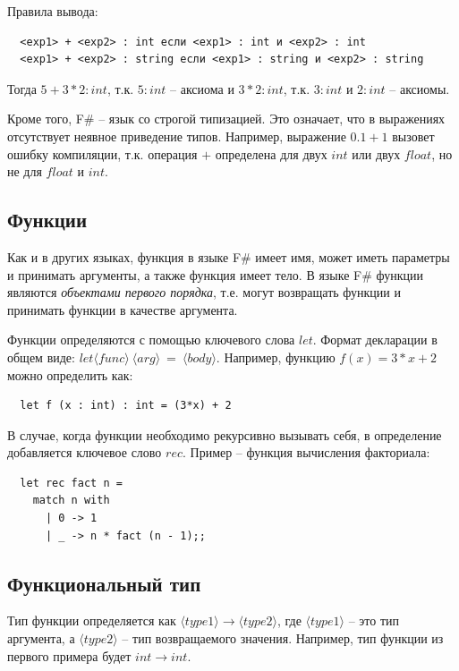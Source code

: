 \documentclass[a4paper,11pt]{article}
\begin{document}
Правила вывода:
\begin{lstlisting}
  <exp1> + <exp2> : int если <exp1> : int и <exp2> : int
  <exp1> + <exp2> : string если <exp1> : string и <exp2> : string
\end{lstlisting}

Тогда $5 + 3 * 2 : int$, т.к. $5 : int$ -- аксиома и $3 * 2 : int$, т.к.
$3 : int$ и $2 : int$ -- аксиомы.

Кроме того, F\# -- язык со строгой типизацией. Это означает, что в выражениях
отсутствует неявное приведение типов. Например, выражение $0.1 + 1$ вызовет
ошибку компиляции, т.к. операция $+$ определена для двух $int$ или двух $float$, но
не для $float$ и $int$.

\subsection{Функции}

Как и в других языках, функция в языке F\# имеет имя, может иметь параметры и 
принимать аргументы, а также функция имеет тело. В языке F\# функции являются
\emph{объектами первого порядка}, т.е. могут возвращать функции и принимать
функции в качестве аргумента.

Функции определяются с помощью ключевого слова $let$. Формат декларации в
общем виде: $let \langle func \rangle~\langle arg \rangle~=~\langle body
\rangle$. Например, функцию $f(x) = 3*x + 2$
можно определить как:
\begin{lstlisting}
  let f (x : int) : int = (3*x) + 2
\end{lstlisting}

В случае, когда функции необходимо рекурсивно вызывать себя, в определение
добавляется ключевое слово $rec$. Пример -- функция вычисления факториала:
\begin{lstlisting}
  let rec fact n =
    match n with
      | 0 -> 1
      | _ -> n * fact (n - 1);;
\end{lstlisting}

\subsection{Функциональный тип}

Тип функции определяется как $\langle type1 \rangle \rightarrow \langle type2 
\rangle$, где $\langle type1 \rangle$ -- это тип аргумента, а $\langle type2
\rangle$ -- тип возвращаемого значения. Например, тип функции из первого примера
будет $int \rightarrow int$.
\end{document}
